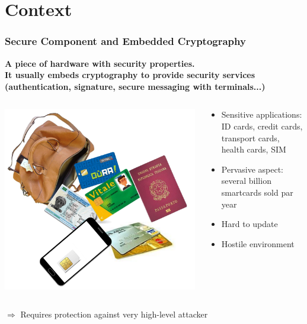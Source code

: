 \section{Context}


\begin{frame}
\frametitle{Secure Component and Embedded Cryptography}
\textbf{A piece of hardware with security properties.}\\
\textbf{It usually embeds cryptography to provide security services (authentication, signature, secure messaging with terminals...)}
\begin{columns}
\begin{column}{0.5\textwidth}
\includegraphics[width = \textwidth]{figures/smartcards.pdf}
\end{column}
\begin{column}{0.5\textwidth}
\begin{itemize}
\item Sensitive applications: ID cards, credit cards, transport cards, health cards, SIM
\item Pervasive aspect: several billion smartcards sold par year
\item Hard to update
\item Hostile environment
\end{itemize}
\end{column}
\end{columns}
$\Rightarrow$ Requires protection against very high-level attacker
\end{frame}

